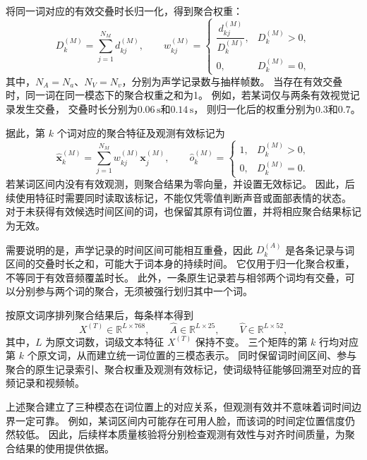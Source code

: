 将同一词对应的有效交叠时长归一化，得到聚合权重：
\begin{equation}
D_k^{(M)}=\sum_{j=1}^{N_M}d_{kj}^{(M)},
\qquad
w_{kj}^{(M)}
=
\begin{cases}
\dfrac{d_{kj}^{(M)}}{D_k^{(M)}},
& D_k^{(M)}>0,\\[6pt]
0,
& D_k^{(M)}=0,
\end{cases}
\label{eq:p1_overlap_weight}
\end{equation}
其中，$N_A=N_a$、$N_V=N_v$，分别为声学记录数与抽样帧数。
当存在有效交叠时，同一词在同一模态下的聚合权重之和为1。
例如，若某词仅与两条有效视觉记录发生交叠，
交叠时长分别为$0.06\,\mathrm{s}$和$0.14\,\mathrm{s}$，
则归一化后的权重分别为$0.3$和$0.7$。

据此，第 $k$ 个词对应的聚合特征及观测有效标记为
\begin{equation}
\widehat{\boldsymbol{x}}_k^{(M)}
=
\sum_{j=1}^{N_M}
w_{kj}^{(M)}\boldsymbol{x}_j^{(M)},
\qquad
\widehat{o}_k^{(M)}
=
\begin{cases}
1, & D_k^{(M)}>0,\\
0, & D_k^{(M)}=0.
\end{cases}
\label{eq:p1_word_pooled_feature}
\end{equation}
若某词区间内没有有效观测，则聚合结果为零向量，并设置无效标记。
因此，后续使用特征时需要同时读取该标记，不能仅凭零值判断声音或面部表情的状态。
对于未获得有效候选时间区间的词，也保留其原有词位置，并将相应聚合结果标记为无效。

需要说明的是，声学记录的时间区间可能相互重叠，因此
$D_k^{(A)}$ 是各条记录与词区间的交叠时长之和，可能大于词本身的持续时间。
它仅用于归一化聚合权重，不等同于有效音频覆盖时长。
此外，一条原生记录若与相邻两个词均有交叠，可以分别参与两个词的聚合，无须被强行划归其中一个词。

按原文词序排列聚合结果后，每条样本得到
\begin{equation}
X^{(T)}\in\mathbb{R}^{L\times768},
\qquad
\widehat{A}\in\mathbb{R}^{L\times25},
\qquad
\widehat{V}\in\mathbb{R}^{L\times52},
\label{eq:p1_aligned_feature_matrices}
\end{equation}
其中，$L$ 为原文词数，词级文本特征 $X^{(T)}$ 保持不变。
三个矩阵的第 $k$ 行均对应第 $k$ 个原文词，从而建立统一词位置的三模态表示。
同时保留词时间区间、参与聚合的原生记录索引、聚合权重及观测有效标记，使词级特征能够回溯至对应的音频记录和视频帧。

上述聚合建立了三种模态在词位置上的对应关系，但观测有效并不意味着词时间边界一定可靠。
例如，某词区间内可能存在可用人脸，而该词的时间定位置信度仍然较低。
因此，后续样本质量核验将分别检查观测有效性与对齐时间质量，为聚合结果的使用提供依据。









